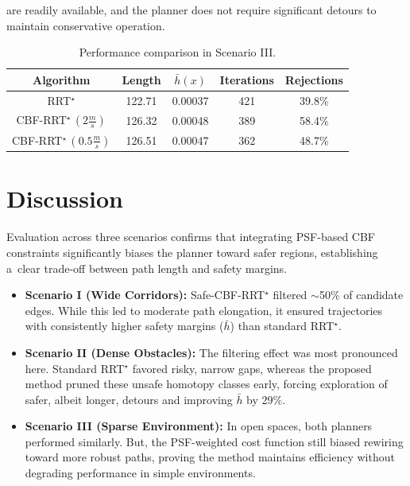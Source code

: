 \documentclass{svproc}
\begin{document}
are readily available, and the planner does not require significant detours to
maintain conservative operation.
\begin{table}[h]
\caption{Performance comparison in Scenario III.}
\begin{center}
\begin{tabular}{|c|c|c|c|c|}
    \hline
    Algorithm       & Length   & $\bar{h}(x)$    & Iterations    &   Rejections\\
    \hline
    RRT$^\star$     & 122.71    & 0.00037   & 421   & 39.8\%   \\
    \hline
    CBF-RRT$^\star\,\left(2\frac{m}{s}\right)$ & 126.32    & 0.00048   & 389   & 58.4\% \\
    \hline
    CBF-RRT$^\star\,\left(0.5\frac{m}{s}\right)$ & 126.51    & 0.00047   & 362   & 48.7\% \\
    \hline
\end{tabular}
\end{center}
\label{tab:performance_scenario_iii}
\end{table}

\section{Discussion}
Evaluation across three scenarios confirms that integrating PSF-based CBF
constraints significantly biases the planner toward safer regions,
establishing a~clear trade-off between path length and safety margins.

\begin{itemize}
    \item \textbf{Scenario I (Wide Corridors):} Safe-CBF-RRT$^\star$ filtered
    $\sim$50\% of candidate edges. While this led to moderate path elongation,
    it ensured trajectories with consistently higher safety margins ($\bar{h}$)
    than standard RRT$^\star$.
    \item \textbf{Scenario II (Dense Obstacles):} The filtering effect was most
    pronounced here. Standard RRT$^\star$ favored risky, narrow gaps, whereas
    the proposed method pruned these unsafe homotopy classes early, forcing
    exploration of safer, albeit longer, detours and improving $\bar{h}$ by 29\%.
    \item \textbf{Scenario III (Sparse Environment):} In open spaces, both
    planners performed similarly. But, the PSF-weighted cost function
    still biased rewiring toward more robust paths, proving the method maintains
    efficiency without degrading performance in simple environments.
\end{itemize}
\end{document}
